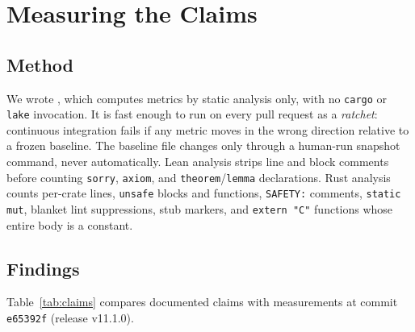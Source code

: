 \documentclass[sigconf,nonacm]{acmart}
\begin{document}
\section{Measuring the Claims}\label{sec:audit}
\subsection{Method}
We wrote , which computes metrics by static analysis only, with no \texttt{cargo} or \texttt{lake} invocation. It is fast enough to run on every pull request as a \emph{ratchet}: continuous integration fails if any metric moves in the wrong direction relative to a frozen baseline. The baseline file changes only through a human-run snapshot command, never automatically. Lean analysis strips line and block comments before counting \texttt{sorry}, \texttt{axiom}, and \texttt{theorem}/\texttt{lemma} declarations. Rust analysis counts per-crate lines, \texttt{unsafe} blocks and functions, \texttt{SAFETY:} comments, \texttt{static mut}, blanket lint suppressions, stub markers, and \texttt{extern "C"} functions whose entire body is a constant.

\subsection{Findings}
Table~\ref{tab:claims} compares documented claims with measurements at commit \texttt{e65392f} (release v11.1.0).
\end{document}
